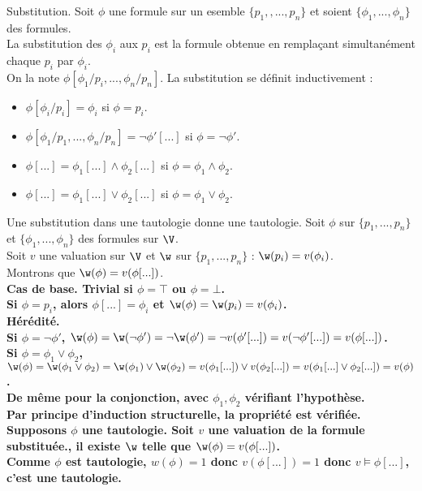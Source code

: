 \documentclass[french, 11pt]{article}
\begin{document}
\begin{defi}{Substitution.}{}
    Soit $\phi$ une formule sur un esemble $\{p_1,,...,p_n\}$ et soient $\{\phi_1,...,\phi_n\}$ des formules.\\
    La substitution des $\phi_i$ aux $p_i$ est la formule obtenue en remplaçant simultanément chaque $p_i$ par $\phi_i$.\\
    On la note $\phi[\phi_1/p_i,...,\phi_n/p_n]$.\n
    La substitution se définit inductivement :
    \begin{itemize}[topsep=0pt,itemsep=-0.9 ex]
        \item $\phi[\phi_i/p_i]=\phi_i$ si $\phi=p_i$.
        \item $\phi[\phi_1/p_1,...,\phi_n/p_n]=\lnot\phi'[...]$ si $\phi=\lnot\phi'$.
        \item $\phi[...]=\phi_1[...]\land\phi_2[...]$ si $\phi=\phi_1\land\phi_2$.
        \item $\phi[...]=\phi_1[...]\lor\phi_2[...]$ si $\phi=\phi_1\lor\phi_2$.
    \end{itemize}
\end{defi}

\begin{prop}{}{}
    Une substitution dans une tautologie donne une tautologie.
    \tcblower
    Soit $\phi$ sur $\{p_1,...,p_n\}$ et $\{\phi_1,...,\phi_n\}$ des formules sur $\V$.\\
    Soit $v$ une valuation sur $\V$ et $\w$ sur $\{p_1,...,p_n\}$ : $\w(p_i)=v(\phi_i)$.\\
    Montrons que $\w(\phi)=v(\phi[...])$.\\
    \bf{Cas de base.} Trivial si $\phi=\top$ ou $\phi=\bot$.\\
    Si $\phi=p_i$, alors $\phi[...]=\phi_i$ et $\w(\phi)=\w(p_i)=v(\phi_i)$.\\
    \bf{Hérédité.}\\
    Si $\phi=\lnot\phi'$, $\w(\phi)=\w(\lnot\phi')=\lnot\w(\phi')=\lnot v(\phi'[...])=v(\lnot\phi'[...])=v(\phi[...])$.\\
    Si $\phi=\phi_1\lor\phi_2$, $\w(\phi)=\w(\phi_1\lor\phi_2)=\w(\phi_1)\lor\w(\phi_2)=v(\phi_1[...])\lor v(\phi_2[...])=v(\phi_1[...]\lor\phi_2[...])=v(\phi)$.\\
    De même pour la conjonction, avec $\phi_1, \phi_2$ vérifiant l'hypothèse.\\
    Par principe d'induction structurelle, la propriété est vérifiée.\n
    Supposons $\phi$ une tautologie. Soit $v$ une valuation de la formule substituée., il existe $\w$ telle que $\w(\phi)=v(\phi[...])$.\\
    Comme $\phi$ est tautologie, $w(\phi)=1$ donc $v(\phi[...])=1$ donc $v\models\phi[...]$, c'est une tautologie.
\end{prop}
\end{document}
